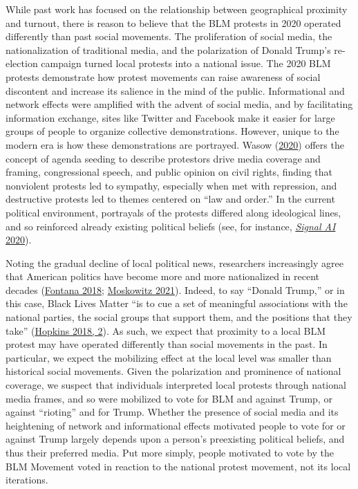 \documentclass[
  12pt,
]{article}
\begin{document}
While past work has focused on the relationship between geographical proximity and turnout, there is reason to believe that the BLM protests in 2020 operated differently than past social movements. The proliferation of social media, the nationalization of traditional media, and the polarization of Donald Trump's re-election campaign turned local protests into a national issue. The 2020 BLM protests demonstrate how protest movements can raise awareness of social discontent and increase its salience in the mind of the public. Informational and network effects were amplified with the advent of social media, and by facilitating information exchange, sites like Twitter and Facebook make it easier for large groups of people to organize collective demonstrations. However, unique to the modern era is how these demonstrations are portrayed. Wasow (\protect\hyperlink{ref-Wasow2020}{2020}) offers the concept of agenda seeding to describe protestors drive media coverage and framing, congressional speech, and public opinion on civil rights, finding that nonviolent protests led to sympathy, especially when met with repression, and destructive protests led to themes centered on ``law and order.'' In the current political environment, portrayals of the protests differed along ideological lines, and so reinforced already existing political beliefs (see, for instance, \protect\hyperlink{ref-SignalAI2020}{\emph{Signal AI} 2020}).

Noting the gradual decline of local political news, researchers increasingly agree that American politics have become more and more nationalized in recent decades (\protect\hyperlink{ref-Fontana2018}{Fontana 2018}; \protect\hyperlink{ref-Moskowitz2021}{Moskowitz 2021}). Indeed, to say ``Donald Trump,'' or in this case, Black Lives Matter ``is to cue a set of meaningful associations with the national parties, the social groups that support them, and the positions that they take'' (\protect\hyperlink{ref-Hopkins2018}{Hopkins 2018, 2}). As such, we expect that proximity to a local BLM protest may have operated differently than social movements in the past. In particular, we expect the mobilizing effect at the local level was smaller than historical social movements. Given the polarization and prominence of national coverage, we suspect that individuals interpreted local protests through national media frames, and so were mobilized to vote for BLM and against Trump, or against ``rioting'' and for Trump. Whether the presence of social media and its heightening of network and informational effects motivated people to vote for or against Trump largely depends upon a person's preexisting political beliefs, and thus their preferred media. Put more simply, people motivated to vote by the BLM Movement voted in reaction to the national protest movement, not its local iterations.
\end{document}
